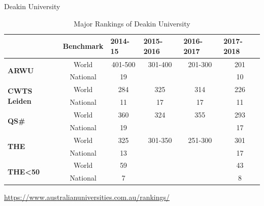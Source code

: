 \documentclass[
 size=14pt,
 paper=smartboard,  %
 mode=present, 		%
 display=slides, 	%
 style=tuliplab,  	%
 pauseslide,
 fleqn,leqno]{powerdot}{}
\begin{document}
\begin{slide}[toc=,bm=]{Deakin University}
\begin{table}[htbp]
  \setlength{\abovecaptionskip}{-21pt}
  \setlength{\belowcaptionskip}{12pt}
  \centering
  \caption{Major Rankings of Deakin University}
    \begin{tabular}{l|c|cccc}
    \toprule
      & \textbf{Benchmark} & \multicolumn{1}{l}{\textbf{2014-15}} & \multicolumn{1}{l}{\textbf{2015-2016}} & \multicolumn{1}{l}{\textbf{2016-2017}} & \multicolumn{1}{l}{\textbf{2017-2018}} \\ \midrule
    \multirow{2}[0]{*}{\textbf{ARWU}} & World & 401-500 & 301-400 & 201-300 & 201 \\
      & National  & 19 &   &   & 10 \\
      \midrule
    \multirow{2}[0]{*}{\textbf{CWTS Leiden}} & World  & 284 & 325 & 314 & 226 \\
      & National  & 11 & 17 & 17 & 11 \\
      \midrule
    \multirow{2}[0]{*}{\textbf{QS\#}} & World  & 360 & 324 & 355 & 293 \\
      & National & 19 &   &   & 17 \\
      \midrule
    \multirow{2}[0]{*}{\textbf{THE} } & World  & 325 & 301-350 & 251-300 & 301 \\
      & National  & 13 &   &   & 17 \\
      \midrule
    \multirow{2}[0]{*}{\textbf{THE<50}} & World  & 59 &   &   & 43 \\
      & National  & 7 &   &   & 8 \\
      \bottomrule
    \end{tabular}
  \label{tab:Deakin Ranking}
\end{table}
\centering
\url{https://www.australianuniversities.com.au/rankings/}
\end{slide}
\end{document}

